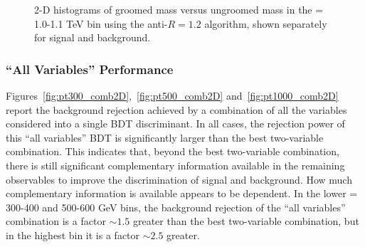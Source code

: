 \begin{figure}
\centering
{}
\caption{2-D histograms of groomed mass versus ungroomed mass in the \pT = 1.0-1.1 TeV bin using the
  anti-\kT $R=1.2$ algorithm, shown separately for signal and background.}
\label{fig:pt1000_2d_masses_AKt_R12}
\end{figure}

\subsubsection{``All Variables'' Performance}\label{sec:Wtagallvars}

Figures~\ref{fig:pt300_comb2D},~\ref{fig:pt500_comb2D}
and~\ref{fig:pt1000_comb2D}  report the background rejection
achieved by a combination of all the variables considered into a
single BDT discriminant. In all cases, the rejection
power of this ``all variables'' BDT is significantly larger than the
best two-variable combination. This indicates
that, beyond the best two-variable combination, there is still
significant complementary information available in the remaining
observables  to improve the discrimination of signal and
background. How much complementary information is available appears to
be \pT dependent. In the lower \pT = 300-400 and 500-600 GeV bins, the
background rejection of the ``all variables'' combination is a factor
$\sim 1.5$ greater than the best two-variable combination, but in the
highest \pT bin it is a factor $\sim 2.5$ greater. 

